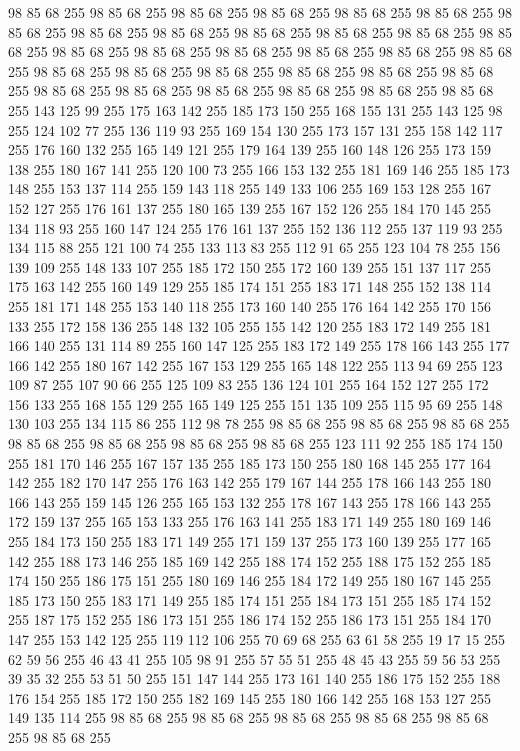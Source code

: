 98 85 68 255 98 85 68 255 98 85 68 255 98 85 68 255 98 85 68 255 98 85 68 255 98 85 68 255 98 85 68 255 98 85 68 255 98 85 68 255 98 85 68 255 98 85 68 255 98 85 68 255 98 85 68 255 98 85 68 255 98 85 68 255 98 85 68 255 98 85 68 255 98 85 68 255 98 85 68 255 98 85 68 255 98 85 68 255 98 85 68 255 98 85 68 255 98 85 68 255 98 85 68 255 98 85 68 255 98 85 68 255 98 85 68 255 98 85 68 255 98 85 68 255 143 125 99 255 175 163 142 255 185 173 150 255 168 155 131 255 143 125 98 255 124 102 77 255 136 119 93 255 169 154 130 255 173 157 131 255 158 142 117 255 176 160 132 255 165 149 121 255 179 164 139 255 160 148 126 255 173 159 138 255 180 167 141 255 120 100 73 255 166 153 132 255 181 169 146 255 185 173 148 255 153 137 114 255 159 143 118 255 149 133 106 255 169 153 128 255 167 152 127 255 176 161 137 255 180 165 139 255 167 152 126 255 184 170 145 255 134 118 93 255 160 147 124 255 176 161 137 255 152 136 112 255
137 119 93 255 134 115 88 255 121 100 74 255 133 113 83 255 112 91 65 255 123 104 78 255 156 139 109 255 148 133 107 255 185 172 150 255 172 160 139 255 151 137 117 255 175 163 142 255 160 149 129 255 185 174 151 255 183 171 148 255 152 138 114 255 181 171 148 255 153 140 118 255 173 160 140 255 176 164 142 255 170 156 133 255 172 158 136 255 148 132 105 255 155 142 120 255 183 172 149 255 181 166 140 255 131 114 89 255 160 147 125 255 183 172 149 255 178 166 143 255 177 166 142 255 180 167 142 255 167 153 129 255 165 148 122 255 113 94 69 255 123 109 87 255 107 90 66 255 125 109 83 255 136 124 101 255 164 152 127 255 172 156 133 255 168 155 129 255 165 149 125 255 151 135 109 255 115 95 69 255 148 130 103 255 134 115 86 255 112 98 78 255 98 85 68 255 98 85 68 255 98 85 68 255 98 85 68 255 98 85 68 255 98 85 68 255 98 85 68 255 123 111 92 255 185 174 150 255 181 170 146 255 167 157 135 255 185 173 150 255 180 168 145 255 177 164 142 255 182 170 147 255 176 163 142 255
179 167 144 255 178 166 143 255 180 166 143 255 159 145 126 255 165 153 132 255 178 167 143 255 178 166 143 255 172 159 137 255 165 153 133 255 176 163 141 255 183 171 149 255 180 169 146 255 184 173 150 255 183 171 149 255 171 159 137 255 173 160 139 255 177 165 142 255 188 173 146 255 185 169 142 255 188 174 152 255 188 175 152 255 185 174 150 255 186 175 151 255 180 169 146 255 184 172 149 255 180 167 145 255 185 173 150 255 183 171 149 255 185 174 151 255 184 173 151 255 185 174 152 255 187 175 152 255 186 173 151 255 186 174 152 255 186 173 151 255 184 170 147 255 153 142 125 255 119 112 106 255 70 69 68 255 63 61 58 255 19 17 15 255 62 59 56 255 46 43 41 255 105 98 91 255 57 55 51 255 48 45 43 255 59 56 53 255 39 35 32 255 53 51 50 255 151 147 144 255 173 161 140 255 186 175 152 255 188 176 154 255 185 172 150 255 182 169 145 255 180 166 142 255 168 153 127 255 149 135 114 255 98 85 68 255 98 85 68 255 98 85 68 255 98 85 68 255 98 85 68 255 98 85 68 255
